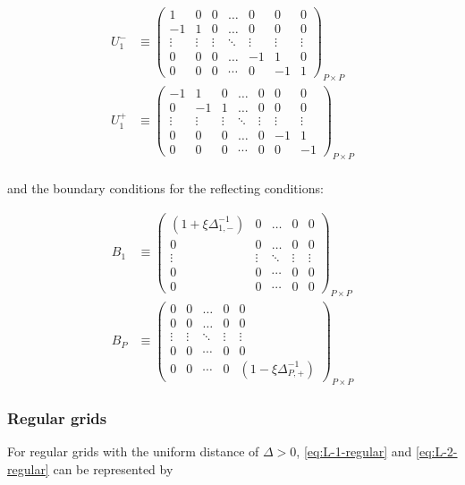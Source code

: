 \documentclass[11pt]{article}
\begin{document}
\begin{align}
U_1^{-} &\equiv \begin{pmatrix}
1  &0&0&\dots&0&0&0\\
-1&1&0&\dots&0&0&0\\
\vdots&\vdots&\vdots&\ddots&\vdots&\vdots&\vdots\\
0&0&0&\dots&-1&1&0\\
0&0&0&\cdots&0&-1&1
\end{pmatrix}_{P\times P}\label{eq:L-1-basis} \\
U_1^{+} &\equiv \begin{pmatrix}
-1  &1&0&\dots&0&0&0\\
0&-1&1&\dots&0&0&0\\
\vdots&\vdots&\vdots&\ddots&\vdots&\vdots&\vdots\\
0&0&0&\dots&0&-1&1\\
0&0&0&\cdots&0&0&-1
\end{pmatrix}_{P\times P}\label{eq:L-1+-basis} \\
\end{align}

and the boundary conditions for the reflecting conditions:

\begin{align}
B_{1}  &\equiv \begin{pmatrix}
(1 + \xi \Delta^{-1}_{1,-}) &0&\dots&0&0\\
0&0&\dots&0&0\\
\vdots&\vdots&\ddots&\vdots&\vdots\\
0&0&\cdots&0&0\\
0&0&\cdots&0&0
\end{pmatrix}_{P\times P} \\
B_{P}  &\equiv \begin{pmatrix}
0 &0&\dots&0&0\\
0&0&\dots&0&0\\
\vdots&\vdots&\ddots&\vdots&\vdots\\
0&0&\cdots&0&0\\
0&0&\cdots&0&(1 - \xi \Delta^{-1}_{P,+})
\end{pmatrix}_{P\times P}
\end{align}

\subsubsection{Regular grids}
For regular grids with the uniform distance of $\Delta > 0$, \eqref{eq:L-1-regular} and \eqref{eq:L-2-regular} can be represented by
\end{document}
